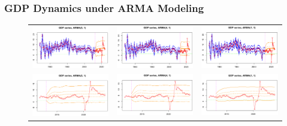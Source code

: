 \documentclass{Configuration_Files/PoliMi3i_thesis}
\begin{document}
\subsubsection{GDP Dynamics under ARMA Modeling}

\begin{figure}[H]
  \centering
  \begin{tabular}{@{}ccc@{}}
    \includegraphics[angle=270,width=0.305\linewidth]{ARMA(5,1)-F.png} &
    \includegraphics[angle=270,width=0.3\linewidth]{FARMA(4,1)a.png} &
    \includegraphics[angle=270,width=0.3\linewidth]{FARMA(1,1)a.png} \\
    \includegraphics[angle=270,width=0.315\linewidth]{ARMA(5,1)-Z.png} &
    \includegraphics[angle=270,width=0.31\linewidth]{ZARMA(4,1)a.png} &
    \includegraphics[angle=270,width=0.3105\linewidth]{ZARMA(1w,1).png} 
  \end{tabular}
\end{figure}
\end{document}
